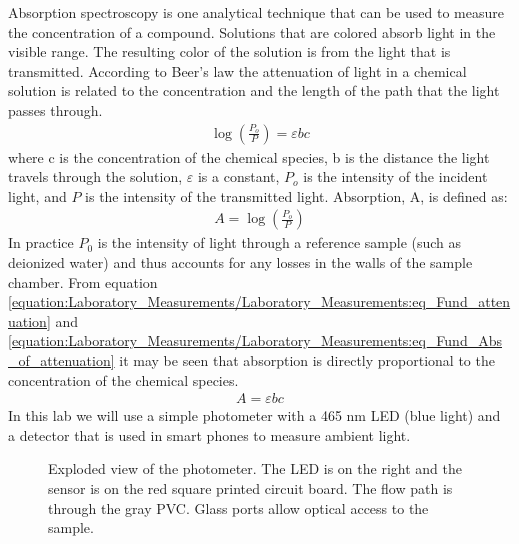 \documentclass[letterpaper,10pt,english]{sphinxmanual}
\let\sphinxpxdimen\pdfpxdimen\else\newdimen\sphinxpxdimen
\begin{document}
Absorption spectroscopy is one analytical technique that can be used to measure the concentration of a compound. Solutions that are colored absorb light in the visible range. The resulting color of the solution is from the light that is transmitted. According to Beer’s law the attenuation of light in a chemical solution is related to the concentration and the length of the path that the light passes through.
\begin{equation}\label{equation:Laboratory_Measurements/Laboratory_Measurements:eq_Fund_attenuation}
\begin{split}\log \left(\frac{P_o }{P} \right)=\varepsilon bc\end{split}
\end{equation}
where c is the concentration of the chemical species, b is the distance the light travels through the solution, \(\varepsilon\) is a constant, \(P_o\) is the intensity of the incident light, and \(P\) is the intensity of the transmitted light. Absorption, A, is defined as:
\begin{equation}\label{equation:Laboratory_Measurements/Laboratory_Measurements:eq_Fund_Abs_of_attenuation}
\begin{split}A=\log \left(\frac{P_{o} }{P} \right)\end{split}
\end{equation}
In practice \(P_0\) is the intensity of light through a reference sample (such as deionized water) and thus accounts for any losses in the walls of the sample chamber. From equation \eqref{equation:Laboratory_Measurements/Laboratory_Measurements:eq_Fund_attenuation} and \eqref{equation:Laboratory_Measurements/Laboratory_Measurements:eq_Fund_Abs_of_attenuation} it may be seen that absorption is directly proportional to the concentration of the chemical species.
\begin{equation}\label{equation:Laboratory_Measurements/Laboratory_Measurements:eq_Fund_Beer}
\begin{split}A=\varepsilon bc\end{split}
\end{equation}
In this lab we will use a simple photometer with a 465 nm LED (blue light) and a detector that is used in smart phones to measure ambient light.

\begin{figure}[htbp]
\centering
\capstart

\noindent\sphinxincludegraphics[width=300\sphinxpxdimen]{{Photometer_exploded}.jpg}
\caption{Exploded view of the photometer. The LED is on the right and the sensor is on the red square printed circuit board. The flow path is through the gray PVC. Glass ports allow optical access to the sample.}\label{\detokenize{Laboratory_Measurements/Laboratory_Measurements:id4}}\label{\detokenize{Laboratory_Measurements/Laboratory_Measurements:figure-spectrophotometer}}\end{figure}
\end{document}
